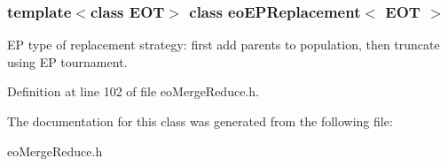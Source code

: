 \subsubsection*{template$<$class EOT$>$ class eo\-EPReplacement$<$ EOT $>$}

EP type of replacement strategy: first add parents to population, then truncate using EP tournament. 



Definition at line 102 of file eo\-Merge\-Reduce.h.

The documentation for this class was generated from the following file:\begin{CompactItemize}
\item 
eo\-Merge\-Reduce.h\end{CompactItemize}
